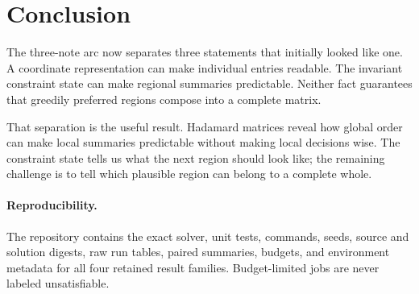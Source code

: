 \documentclass[10pt,twoside]{article}
\theoremstyle{noteplain}
\theoremstyle{definition}
\begin{document}
\section{Conclusion}

The three-note arc now separates three statements that initially looked like one.  A coordinate representation can make individual entries readable.  The invariant constraint state can make regional summaries predictable.  Neither fact guarantees that greedily preferred regions compose into a complete matrix.

That separation is the useful result.  Hadamard matrices reveal how global order can make local summaries predictable without making local decisions wise.  The constraint state tells us what the next region should look like; the remaining challenge is to tell which plausible region can belong to a complete whole.

\paragraph{Reproducibility.}
The repository contains the exact solver, unit tests, commands, seeds, source and solution digests, raw run tables, paired summaries, budgets, and environment metadata for all four retained result families.  Budget-limited jobs are never labeled unsatisfiable.



\end{document}
